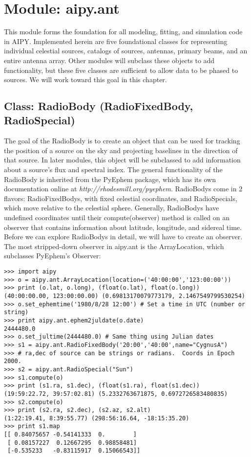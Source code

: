 \section{Module: aipy.ant}

This module forms the foundation for all modeling, fitting, and simulation code
in AIPY.  Implemented herein are five foundational classes for representing
individual celestial sources, catalogs of sources, antennas, primary beams,
and an entire antenna array.  Other modules will subclass these objects
to add functionality, but these five classes are sufficient to allow
data to be phased to sources.  We will work toward this goal in this chapter.

\subsection{Class: RadioBody (RadioFixedBody, RadioSpecial)}

The goal of the RadioBody is to create an object that can be used for
tracking the position of a source on the sky and projecting baselines in
the direction of that source.  In later modules, this object will be
subclassed to add information about a source's flux and spectral index.
The general functionality of the RadioBody is inherited from the PyEphem
package, which has its own documentation online at 
{\it http://rhodesmill.org/pyephem}.  
RadioBodys come
in 2 flavors: RadioFixedBodys, with fixed celestial coordinates, and
RadioSpecials, which move relative to the celestial sphere.  Generally,
RadioBodys have undefined coordinates until their compute(observer)
method is called on an observer that contains information about latitude, 
longitude, and sidereal time.  Before we can explore RadioBodys
in detail, we will have to create an observer. The most stripped-down 
observer in aipy.ant is the ArrayLocation, which subclasses PyEphem's Observer:

\begin{verbatim}
>>> import aipy
>>> o = aipy.ant.ArrayLocation(location=('40:00:00','123:00:00'))
>>> print (o.lat, o.long), (float(o.lat), float(o.long))
(40:00:00.00, 123:00:00.00) (0.69813170079773179, 2.1467549799530254)
>>> o.set_ephemtime('1980/8/28 12:00') # Set a time in UTC (number or string)
>>> print aipy.ant.ephem2juldate(o.date)
2444480.0
>>> o.set_jultime(2444480.0) # Same thing using Julian dates
>>> s1 = aipy.ant.RadioFixedBody('20:00','40:00',name="CygnusA")
>>> # ra,dec of source can be strings or radians.  Coords in Epoch 2000.
>>> s2 = aipy.ant.RadioSpecial("Sun")
>>> s1.compute(o)
>>> print (s1.ra, s1.dec), (float(s1.ra), float(s1.dec))
(19:59:22.72, 39:57:02.81) (5.2332763671875, 0.6972726583480835)
>>> s2.compute(o)
>>> print (s2.ra, s2.dec), (s2.az, s2.alt)
(1:22:19.41, 8:39:55.77) (298:56:16.64, -18:15:35.20)
>>> print s1.map
[[ 0.84075657 -0.54141333  0.        ]
 [ 0.08157227  0.12667295  0.98858481]
 [-0.535233   -0.83115917  0.15066543]]
\end{verbatim}

